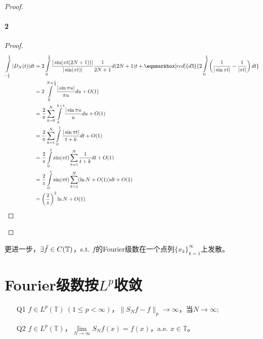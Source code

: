 \begin{proof}
    \paragraph{2}
    \begin{proof}
        \begin{align*}
            \int\limits_{-\frac{1}{2}}^{\frac{1}{2}} |D_N(t)| dt & = 2\int\limits_0^{\frac{1}{2}} \frac{|\sin(\pi t(2N+1))|}{|\sin(\pi t)|} \frac{1}{2N+1} d(2N+1)t + \eqnmarkbox[red]{d3}{2\int\limits_{0}^{\frac{1}{2}} \left(\frac{1}{|\sin \pi t|} - \frac{1}{|\pi t|} \right) dt} \\
            & = 2\int\limits_{0}^{N+\frac{1}{2}} \frac{|\sin\pi u|}{\pi u} du + O(1) \\
            & = \frac{2}{\pi} \sum\limits_{k=0}^N \int\limits_{k}^{k+1} \frac{|\sin\pi u}{u} du + O(1) \\
            & = \frac{2}{\pi} \sum\limits_{k=1}^N \int\limits_0^1 \frac{|\sin\pi t|}{t+k} dt + O(1)\\ 
            & = \frac{2}{\pi} \int\limits_0^1 \sin(\pi t) \sum\limits_{k=1}^N \frac{1}{t+k} dt + O(1) \\
            & = \frac{2}{\pi } \int\limits_0^1 \sin(\pi t) \sum\limits_{k=1}^N (\ln N + O(1)) dt + O(1) \\
            & = \left(\frac{2}{\pi}\right)^2 \ln N + O(1)
         \end{align*}
        
    \end{proof}
\end{proof}

\begin{remark}
    更进一步，$\exists\Tilde{f}\in C(\mathbb{T})$，s.t. $f$的Fourier级数在一个点列$\{x_k\}_{k=1}^{\infty}$上发散。
\end{remark}

\newpage
\section{Fourier级数按$L^p$收敛}
\begin{enumerate}[leftmargin=1cm, label=\arabic*]
    \item[Q1] $f\in L^p(\mathbb{T})\ (1\leqslant p< \infty)$，$\|S_N f - f\|_p \to \infty$，当$N\to\infty$;
    \item[Q2] $f\in L^p(\mathbb{T})$，$\lim\limits_{N\to\infty} S_N f(x) = f(x)$，a.e. $x\in\mathbb{T}$。
\end{enumerate}

